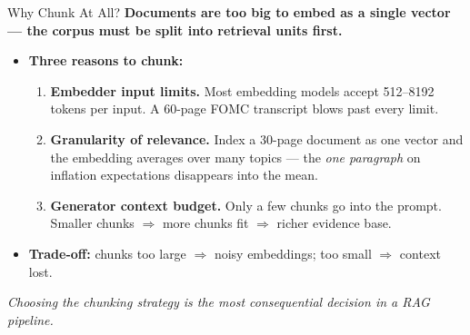 \begin{frame}{Why Chunk At All?}
\textbf{Documents are too big to embed as a single vector --- the corpus must be split into retrieval units first.}

\medskip
\begin{itemize}
\item \textbf{Three reasons to chunk:}
\begin{enumerate}
    \item \textbf{Embedder input limits.} Most embedding models accept 512--8192 tokens per input. A 60-page FOMC transcript blows past every limit.
    \item \textbf{Granularity of relevance.} Index a 30-page document as one vector and the embedding averages over many topics --- the \emph{one paragraph} on inflation expectations disappears into the mean.
    \item \textbf{Generator context budget.} Only a few chunks go into the prompt. Smaller chunks $\Rightarrow$ more chunks fit $\Rightarrow$ richer evidence base.
\end{enumerate}

\medskip
\item \textbf{Trade-off:} chunks too large $\Rightarrow$ noisy embeddings; too small $\Rightarrow$ context lost.
\end{itemize}

\medskip
\begin{takeawaybox}
\emph{Choosing the chunking strategy is the most consequential decision in a RAG pipeline.}
\end{takeawaybox}
\end{frame}

